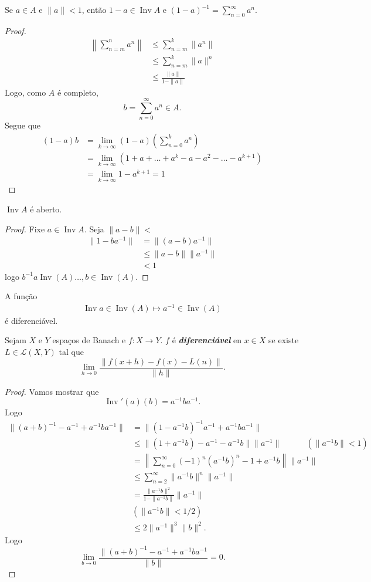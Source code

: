 \documentclass[portuguese]{article}
\theoremstyle{definition}
\begin{document}
\begin{prop}
	Se $a\in A$ e $\|a\|<1$, então $1-a\in\operatorname{Inv}A$ e $(1-a)^{-1}=\sum_{n=0}^\infty a^n$.
\end{prop}
\begin{proof}
	\begin{align*}
		\left\|\sum_{n=m}^na^n\right\|&\leq\sum_{n=m}^k\|a^n\|\\
		&\leq\sum_{n=m}^k\|a\|^n\\
		&\leq\frac{\|a\|}{1-\|a\|}
	\end{align*}
	Logo, como $A$ é completo,
	\[b=\sum_{n=0}^\infty a^n\in A.\]
	Segue que
	\begin{align*}
		(1-a)b&=\lim_{k\to\infty}(1-a)\left(\sum_{n=0}^ka^n\right)\\
		&=\lim_{k\to\infty}(1+a+\ldots+a^k-a-a^2-\ldots-a^{k+1})\\
		&=\lim_{k\to\infty}1-a^{k+1}=1
	\end{align*}
\end{proof}
\begin{coro}
	$\operatorname{Inv}A$ é aberto.
\end{coro}
\begin{proof}
	Fixe $a\in\operatorname{Inv}A$. Seja $\|a-b\|<$
	\begin{align*}
		\|1-ba^{-1}\|&=\|(a-b)a^{-1}\|\\
		&\leq\|a-b\|\|a^{-1}\|\\
		&<1
	\end{align*}
	logo $b^{-1}a\operatorname{Inv}(A)\ldots,b\in\operatorname{Inv}(A)$.
\end{proof}
\begin{teo}
	A função 
	\begin{align*}
		\operatorname{Inv}a\in\operatorname{Inv}(A)\mapsto a^{-1}\in\operatorname{Inv}(A)
	\end{align*}
	é diferenciável.
\end{teo}
\begin{obs}[Relembre]
	Sejam $X$ e $Y$ espaços de Banach e $f:X\to Y$. $f$ é \textbf{\textit{diferenciável}} en $x\in X$ se existe $L\in\mathcal{L}(X,Y)$ tal que
	\[\lim_{h\to 0}\frac{\|f(x+h)-f(x)-L(n)\|}{\|h\|}.\]
\end{obs}
\begin{proof}
	Vamos mostrar que
	\[\operatorname{Inv}'(a)(b)=a^{-1}ba^{-1}.\]
	Logo
	\begin{align*}
		\|(a+b)^{-1}-a^{-1}+a^{-1}ba^{-1}\|&=\|(1-a^{-1}b)^{-1}a^{-1}+a^{-1}ba^{-1}\|\\
		&\leq\|(1+a^{-1}b)-a^{-1}-a^{-1}b\|\|a^{-1}\|\quad\qquad(\|a^{-1}b\|<1)\\
		&=\left\|\sum_{n=0}^\infty(-1)^n(a^{-1}b)^n-1+a^{-1}b\right\|\|a^{-1}\|\\
		&\leq\sum_{n=2}^\infty\|a^{-1}b\|^n\|a^{-1}\|\\
		&=\frac{\|a^{-1}b\|^2}{1-\|a^{-1}b\|}\|a^{-1}\|\\
		&(\|a^{-1}b\|<1/2)\\
		&\leq2\|a^{-1}\|^3\|b\|^2.
	\end{align*}
	Logo
	\[\lim_{b\to0}\frac{\|(a+b)^{-1}-a^{-1}+a^{-1}ba^{-1}}{\|b\|}=0.\]
\end{proof}
\end{document}
